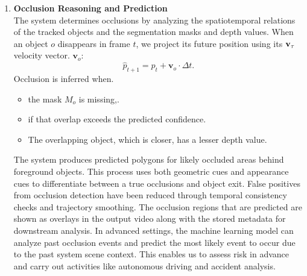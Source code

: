 \documentclass[12pt,a4paper]{report}
\theoremstyle{definition}
\theoremstyle{remark}
\begin{document}
\begin{enumerate}
    \item \textbf{Occlusion Reasoning and Prediction}\\
    The system determines occlusions by analyzing the spatiotemporal relations of the tracked objects and the segmentation masks and depth values. When an object $o$ disappears in frame $t$, we project its future position using its ${\bf v}_{\tau}$ velocity vector. $\mathbf{v}_o$:
    \begin{equation}
    \hat{p}_{t+1} = p_t + \mathbf{v}_o \cdot \Delta t.
    \end{equation}
    Occlusion is inferred when.
    \begin{itemize}
        \item the mask $M_o$ is missing,.
        \item if that overlap exceeds the predicted confidence.
        \item The overlapping object, which is closer, has a lesser depth value.
    \end{itemize}
    The system  produces predicted polygons for likely occluded areas behind foreground objects. This process uses both geometric cues and appearance cues to differentiate between a true occlusions and object exit. False positives from occlusion detection have been reduced through temporal consistency checks and trajectory smoothing. The occlusion regions that are predicted are shown as overlays in the output video along with the stored metadata for downstream analysis. In advanced settings, the machine learning model can analyze past occlusion events and predict the most likely event to occur due to the past system scene context. This enables us to assess risk in advance and carry out activities like autonomous driving and accident analysis.


\end{enumerate}
\end{document}

